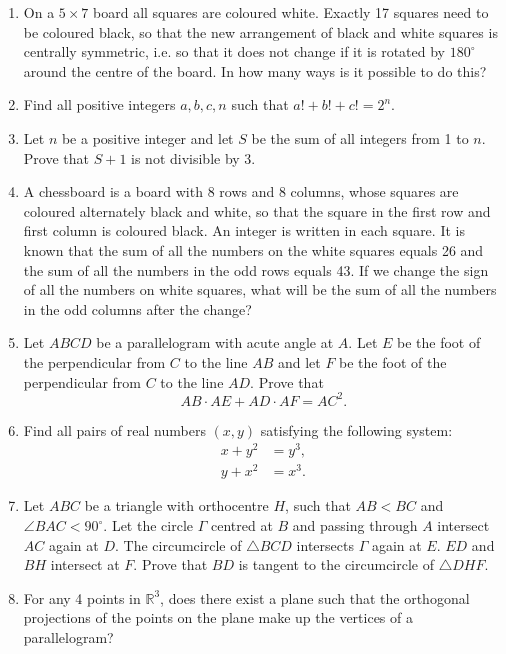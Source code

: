\documentclass{article}
\begin{document}
\begin{enumerate}

\bigskip
\item %
On a $5 \times 7$ board all squares are coloured white. Exactly 17 squares need to be coloured black, so that the new arrangement of black and white squares is centrally symmetric, i.e. so that it does not change if it is rotated by $180^{\circ}$ around the centre of the board. In how many ways is it possible to do this?


\bigskip
\item %
Find all positive integers $a,b,c,n$ such that $a!+b!+c! = 2^n$.


\bigskip
\item %
Let $n$ be a positive integer and let $S$ be the sum of all integers from 1 to $n$. Prove that $S+1$ is not divisible by 3.


\bigskip
\item 
A chessboard is a board with 8 rows and 8 columns, whose squares are coloured alternately black and white, so that the square in the first row and first column is coloured black.
An integer is written in each square.
It is known that the sum of all the numbers on the white squares equals 26 and the sum of all the numbers in the odd rows equals 43.
If we change the sign of all the numbers on white squares, what will be the sum of all the numbers in the odd columns after the change?


\bigskip
\item %
Let $ABCD$ be a parallelogram with acute angle at $A$.
Let $E$ be the foot of the perpendicular from $C$ to the line $AB$ and let $F$ be the foot of the perpendicular from $C$ to the line $AD$.
Prove that
\[ AB \cdot AE + AD \cdot AF = AC^2. \]


\smallskip
\item %
Find all pairs of real numbers $(x,y)$ satisfying the following system:
\begin{align*}
x + y^2 &= y^3, \\
y + x^2 &= x^3.
\end{align*}
	

\medskip
\item %
Let $ABC$ be a triangle with orthocentre $H$, such that $AB<BC$ and $\angle BAC < 90^\circ$.
Let the circle $\Gamma$ centred at $B$ and passing through $A$ intersect $AC$ again at $D$.
The circumcircle of $\triangle BCD$ intersects $\Gamma$ again at $E$.
$ED$ and $BH$ intersect at $F$.
Prove that $BD$ is tangent to the circumcircle of $\triangle DHF$.


\medskip
\item %
For any 4 points in $\mathbb{R}^3$, does there exist a plane such that the orthogonal projections of the points on the plane make up the vertices of a parallelogram?


\end{enumerate}
\end{document}
